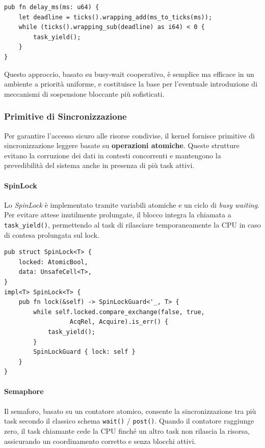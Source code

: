 \documentclass[italian, Lau, oneside]{sapthesis} %
\begin{document}
\begin{center}
\begin{verbatim}
pub fn delay_ms(ms: u64) {
    let deadline = ticks().wrapping_add(ms_to_ticks(ms));
    while (ticks().wrapping_sub(deadline) as i64) < 0 {
        task_yield();
    }
}
\end{verbatim}
\end{center}

Questo approccio, basato su busy-wait cooperativo, è semplice ma efficace in un ambiente a priorità uniforme, e costituisce la base per l’eventuale introduzione di meccanismi di sospensione bloccante più sofisticati.

\subsubsection*{Primitive di Sincronizzazione}

Per garantire l’accesso sicuro alle risorse condivise, il kernel fornisce primitive di sincronizzazione leggere basate su \textbf{operazioni atomiche}.  
Queste strutture evitano la corruzione dei dati in contesti concorrenti e mantengono la prevedibilità del sistema anche in presenza di più task attivi.

\paragraph{SpinLock}  
Lo \emph{SpinLock} è implementato tramite variabili atomiche e un ciclo di \emph{busy waiting}.  
Per evitare attese inutilmente prolungate, il blocco integra la chiamata a \texttt{task\_yield()}, permettendo al task di rilasciare temporaneamente la CPU in caso di contesa prolungata sul lock.

\begin{center}
\begin{verbatim}
pub struct SpinLock<T> {
    locked: AtomicBool,
    data: UnsafeCell<T>,
}
impl<T> SpinLock<T> {
    pub fn lock(&self) -> SpinLockGuard<'_, T> {
        while self.locked.compare_exchange(false, true,
                  AcqRel, Acquire).is_err() {
            task_yield();
        }
        SpinLockGuard { lock: self }
    }
}
\end{verbatim}
\end{center}

\paragraph{Semaphore}  
Il semaforo, basato su un contatore atomico, consente la sincronizzazione tra più task secondo il classico schema \texttt{wait()} / \texttt{post()}.  
Quando il contatore raggiunge zero, il task chiamante cede la CPU finché un altro task non rilascia la risorsa, assicurando un coordinamento corretto e senza blocchi attivi.
\end{document}
